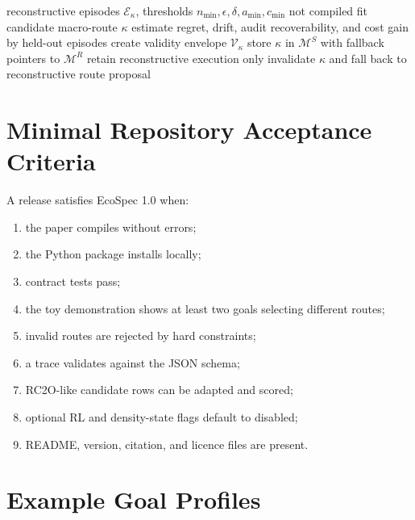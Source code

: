 \documentclass[10pt]{article}
\newcommand{\M}{\mathcal{M}}
\begin{document}
\begin{algorithm}[h]
\caption{Synthetic-memory compilation and invalidation}
\begin{algorithmic}[1]
\Require reconstructive episodes $\mathcal E_\kappa$, thresholds $n_{\min},\epsilon,\delta,a_{\min},c_{\min}$
  \State \Return not compiled
\EndIf
\State fit candidate macro-route $\kappa$
\State estimate regret, drift, audit recoverability, and cost gain by held-out episodes
  \State create validity envelope $\mathcal V_\kappa$
  \State store $\kappa$ in $\M^S$ with fallback pointers to $\M^R$
\Else
  \State retain reconstructive execution only
\EndIf
{}
    \State invalidate $\kappa$ and fall back to reconstructive route proposal
  \EndIf
\EndFor
\end{algorithmic}
\end{algorithm}

\section{Minimal Repository Acceptance Criteria}

A release satisfies EcoSpec 1.0 when:
\begin{enumerate}
  \item the paper compiles without errors;
  \item the Python package installs locally;
  \item contract tests pass;
  \item the toy demonstration shows at least two goals selecting different routes;
  \item invalid routes are rejected by hard constraints;
  \item a trace validates against the JSON schema;
  \item RC2O-like candidate rows can be adapted and scored;
  \item optional RL and density-state flags default to disabled;
  \item README, version, citation, and licence files are present.
\end{enumerate}

\section{Example Goal Profiles}
\end{document}
